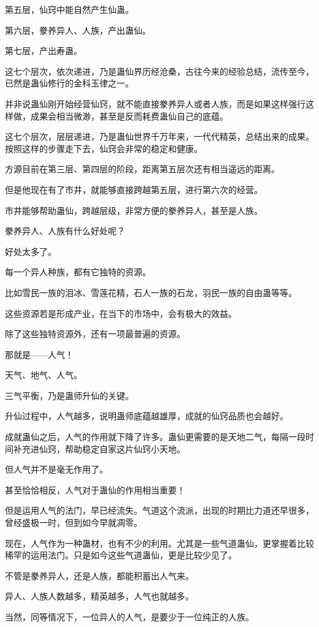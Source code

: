 \begin{this_body}
第五层，仙窍中能自然产生仙蛊。

第六层，豢养异人、人族，产出蛊仙。

第七层，产出寿蛊。

这七个层次，依次递进，乃是蛊仙界历经沧桑，古往今来的经验总结，流传至今，已然是蛊仙修行的金科玉律之一。

并非说蛊仙刚开始经营仙窍，就不能直接豢养异人或者人族，而是如果这样强行这样做，成果会相当微渺，甚至是反而耗费蛊仙自己的底蕴。

这七个层次，层层递进，乃是蛊仙世界千万年来，一代代精英，总结出来的成果。按照这样的步骤走下去，仙窍会非常的稳定和健康。

方源目前在第三层、第四层的阶段，距离第五层次还有相当遥远的距离。

但是他现在有了市井，就能够直接跨越第五层，进行第六次的经营。

市井能够帮助蛊仙，跨越层级，非常方便的豢养异人，甚至是人族。

豢养异人、人族有什么好处呢？

好处太多了。

每一个异人种族，都有它独特的资源。

比如雪民一族的泪冰、雪莲花精，石人一族的石龙，羽民一族的自由蛊等等。

这些资源若是形成产业，在当下的市场中，会有极大的效益。

除了这些独特资源外，还有一项最普遍的资源。

那就是——人气！

天气、地气、人气。

三气平衡，乃是蛊师升仙的关键。

升仙过程中，人气越多，说明蛊师底蕴越雄厚，成就的仙窍品质也会越好。

成就蛊仙之后，人气的作用就下降了许多。蛊仙更需要的是天地二气，每隔一段时间补充进仙窍，帮助稳定自家这片仙窍小天地。

但人气并不是毫无作用了。

甚至恰恰相反，人气对于蛊仙的作用相当重要！

但是运用人气的法门，早已经流失。气道这个流派，出现的时期比力道还早很多，曾经盛极一时，但到如今早就凋零。

现在，人气作为一种蛊材，也有不少的利用。尤其是一些气道蛊仙，更掌握着比较稀罕的运用法门。只是如今这些气道蛊仙，更是比较少见了。

不管是豢养异人，还是人族，都能积蓄出人气来。

异人、人族人数越多，精英越多，人气也就越多。

当然，同等情况下，一位异人的人气，是要少于一位纯正的人族。


\end{this_body}
